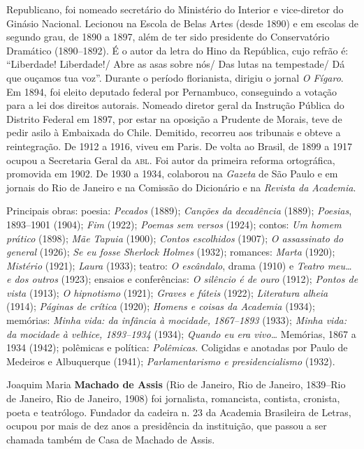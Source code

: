 Republicano, foi nomeado secretário do Ministério do Interior e
vice-diretor do Ginásio Nacional. Lecionou na Escola de Belas Artes
(desde 1890) e em escolas de segundo grau, de 1890 a 1897, além de ter
sido presidente do Conservatório Dramático (1890--1892). É o autor da
letra do Hino da República, cujo refrão é: ``Liberdade! Liberdade!/ Abre
as asas sobre nós/ Das lutas na tempestade/ Dá que ouçamos tua voz''.
Durante o período florianista, dirigiu o jornal \emph{O Fígaro}. Em
1894, foi eleito deputado federal por Pernambuco, conseguindo a votação
para a lei dos direitos autorais. Nomeado diretor geral da Instrução
Pública do Distrito Federal em 1897, por estar na oposição a Prudente de
Morais, teve de pedir asilo à Embaixada do Chile. Demitido, recorreu aos
tribunais e obteve a reintegração. De 1912 a 1916, viveu em Paris. De
volta ao Brasil, de 1899 a 1917 ocupou a Secretaria Geral da \textsc{abl}. Foi
autor da primeira reforma ortográfica, promovida em 1902. De 1930 a
1934, colaborou na \emph{Gazeta} de São Paulo e em jornais do Rio de
Janeiro e na Comissão do Dicionário e na \emph{Revista da Academia}.

Principais obras: poesia: \emph{Pecados} (1889); \emph{Canções da
decadência} (1889); \emph{Poesias}, 1893--1901 (1904); \emph{Fim} (1922);
\emph{Poemas sem versos} (1924); contos: \emph{Um homem prático} (1898);
\emph{Mãe Tapuia} (1900); \emph{Contos escolhidos} (1907); \emph{O
assassinato do general} (1926); \emph{Se eu fosse Sherlock Holmes}
(1932); romances: \emph{Marta} (1920); \emph{Mistério} (1921);
\emph{Laura} (1933); teatro: \emph{O escândalo}, drama (1910) e
\emph{Teatro meu\ldots{} e dos outros} (1923); ensaios e conferências:
\emph{O silêncio é de ouro} (1912); \emph{Pontos de vista} (1913);
\emph{O hipnotismo} (1921); \emph{Graves e fúteis} (1922);
\emph{Literatura alheia} (1914); \emph{Páginas de crítica} (1920);
\emph{Homens e coisas da Academia} (1934); memórias: \emph{Minha vida:
da infância à mocidade, 1867--1893} (1933); \emph{Minha vida: da mocidade
à velhice, 1893--1934} (1934); \emph{Quando eu era vivo\ldots{}}
Memórias, 1867 a 1934 (1942); polêmicas e política: \emph{Polêmicas}.
Coligidas e anotadas por Paulo de Medeiros e Albuquerque (1941);
\emph{Parlamentarismo e presidencialismo} (1932).

Joaquim Maria \textbf{Machado de Assis} (Rio de Janeiro, Rio de Janeiro,
1839--Rio de Janeiro, Rio de Janeiro, 1908) foi jornalista, romancista,
contista, cronista, poeta e teatrólogo. Fundador da cadeira n. 23 da
Academia Brasileira de Letras, ocupou por mais de dez anos a presidência
da instituição, que passou a ser chamada também de Casa de Machado de
Assis.

